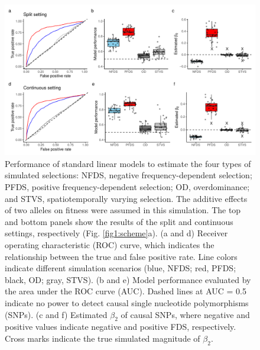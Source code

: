 \documentclass[12pt,]{article}
\begin{document}
\begin{figure}[ht]
  \includegraphics[width=0.85\linewidth]{beta2LMadd.pdf}
  \caption{Performance of standard linear models to estimate the four types of simulated selections: NFDS, negative frequency-dependent selection; PFDS, positive frequency-dependent selection; OD, overdominance; and STVS, spatiotemporally varying selection. The additive effects of two alleles on fitness were assumed in this simulation. The top and bottom panels show the results of the split and continuous settings, respectively (Fig. \ref{fig1:scheme}a). (a and d) Receiver operating characteristic (ROC) curve, which indicates the relationship between the true and false positive rate. Line colors indicate different simulation scenarios (blue, NFDS; red, PFDS; black, OD; gray, STVS). (b and e) Model performance evaluated by the area under the ROC curve (AUC). Dashed lines at AUC = 0.5 indicate no power to detect causal single nucleotide polymorphisms (SNPs). (c and f) Estimated $\beta_2$ of causal SNPs, where negative and positive values indicate negative and positive FDS, respectively. Cross marks indicate the true simulated magnitude of $\beta_2$.}
  \label{figS:beta2LMadd}
\end{figure}
\end{document}
